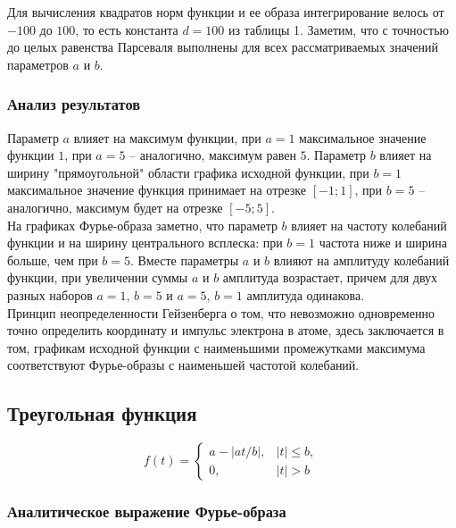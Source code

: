 \documentclass[a5paper, 10pt]{article}
\theoremstyle{definition}
\theoremstyle{plain}
\theoremstyle{remark}
\begin{document}
Для вычисления квадратов норм функции и ее образа интегрирование велось от $-100$ до $100$, то есть константа $d=100$ из таблицы 1. Заметим, что с точностью до целых равенства Парсеваля выполнены для всех рассматриваемых значений параметров $a$ и $b$.

\subsubsection{Анализ результатов}

Параметр $a$ влияет на максимум функции, при $a = 1$ максимальное значение функции $1$, при $a = 5$ -- аналогично, максимум равен $5$. Параметр $b$ влияет на ширину "прямоугольной" области графика исходной функции, при $b=1$ максимальное значение функция принимает на отрезке $[-1;1]$, при $b=5$ -- аналогично, максимум будет на отрезке $[-5; 5]$.\\

На графиках Фурье-образа заметно, что параметр $b$ влияет на частоту колебаний функции и на ширину центрального всплеска: при $b=1$ частота ниже и ширина больше, чем при $b=5$. Вместе параметры $a$ и $b$ влияют на амплитуду колебаний функции, при увеличении суммы $a$ и $b$ амплитуда возрастает, причем для двух разных наборов $a = 1, \, b=5$ и $a=5, \, b=1$ амплитуда одинакова.\\

Принцип неопределенности Гейзенберга о том, что невозможно одновременно точно определить координату и импульс электрона в атоме, здесь заключается в том, графикам исходной функции с наименьшими промежутками максимума соответствуют Фурье-образы с наименьшей частотой колебаний.







\newpage
\subsection{Треугольная функция}

\begin{equation}
f(t) =
\begin{cases}
a - |at / b|, & |t| \leq b,\\
0, & |t| > b
\end{cases}
\end{equation}


\subsubsection{Аналитическое выражение Фурье-образа}
\end{document}
